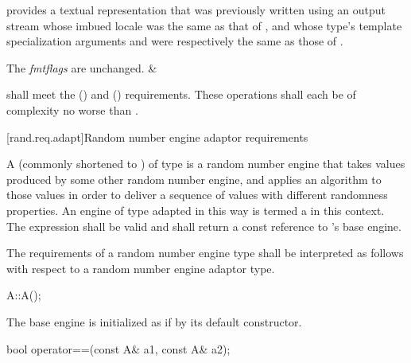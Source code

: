 \begin{libreqtab4d}
    \expects
     provides a textual representation
    that was previously written
    using an output stream
    whose imbued locale
    was the same as that of ,
    and whose type's template specialization arguments
     and 
    were respectively the same as those of .

    \ensures The \textit{fmtflags} are unchanged.
  & 
  \\
\end{libreqtab4d}

\pnum
{} shall meet the
 ()
and  () requirements.
These operations shall each be of complexity
no worse than .


%



[rand.req.adapt]{Random number engine adaptor requirements}%

\pnum
A 
(commonly shortened to )
 of type 
is a random number engine
that takes values
produced by some other random number engine,
and applies an algorithm to those values
in order to deliver a sequence of values
with different randomness properties.
An engine  of type  adapted in this way
is termed a 
in this context.
The expression  shall be valid and shall return a
const reference to 's base engine.

\pnum
The requirements of a random number engine type
shall be interpreted as follows
with respect to a random number engine adaptor type.

\begin{itemdecl}
A::A();
\end{itemdecl}

\begin{itemdescr}
\pnum
\effects
 The base engine is initialized
 as if by its default constructor.
\end{itemdescr}

\begin{itemdecl}
bool operator==(const A& a1, const A& a2);
\end{itemdecl}

